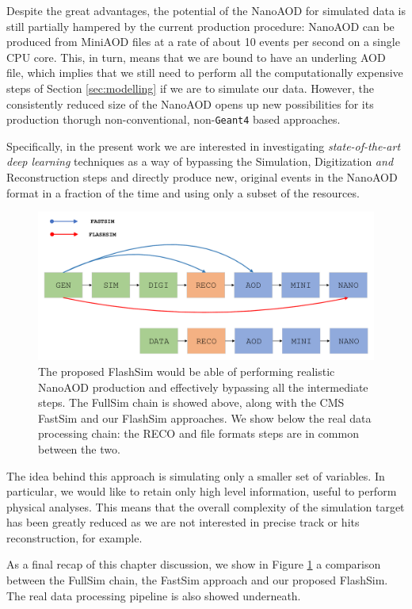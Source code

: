 Despite the great advantages, the potential of the NanoAOD for simulated data is still partially hampered by the current production procedure: NanoAOD can be produced from MiniAOD files at a rate of about 10 events per second on a
single CPU core. This, in turn, means that we are bound to have an underling AOD file, which implies that we still need to perform all the computationally expensive steps of Section \ref{sec:modelling} if we are to simulate our data.
However, the consistently reduced size of the NanoAOD opens up new possibilities for its production thorugh non-conventional, non-\texttt{Geant4} based approaches. 

Specifically, in the present work we are interested in investigating \emph{state-of-the-art deep learning} techniques as a way of bypassing the Simulation, Digitization \emph{and} Reconstruction steps and directly produce new, original events in the NanoAOD format in a fraction of the time and using only a subset of the resources.

\begin{figure}
    \centering
    \includegraphics[width=\columnwidth]{gfx/ch2/sim_comp.pdf}
    \caption[Simulation comparison]{The proposed FlashSim would be able of performing realistic NanoAOD production and effectively bypassing all the intermediate steps. The FullSim chain is showed above, along with the CMS FastSim and our FlashSim approaches. We show below the real data processing chain: the RECO and file formats steps are in common between the two.}
    \label{fig:sim_comp}
\end{figure}

The idea behind this approach is simulating only a smaller set of variables. In particular, we would like to retain only high level information, useful to perform physical analyses. This means that the overall complexity of the simulation target has been greatly reduced as we are not interested in precise track or hits reconstruction, for example.

As a final recap of this chapter discussion, we show in Figure \ref{fig:sim_comp} a comparison between the FullSim chain, the FastSim approach and our proposed FlashSim. The real data processing pipeline is also showed underneath.
